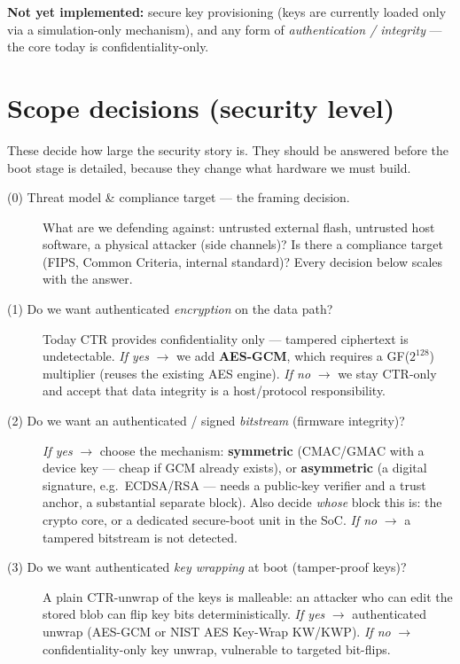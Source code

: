 \documentclass[11pt,a4paper]{article}
\begin{document}
\noindent\textbf{Not yet implemented:} secure key provisioning (keys are currently loaded only via a
simulation-only mechanism), and any form of \emph{authentication / integrity} --- the core today is
confidentiality-only.

\section{Scope decisions (security level)}

\noindent These decide how large the security story is. They should be answered before the boot
stage is detailed, because they change what hardware we must build.

\begin{description}

  \item[(0) Threat model \& compliance target --- the framing decision.]
    What are we defending against: untrusted external flash, untrusted host software, a physical
    attacker (side channels)? Is there a compliance target (FIPS, Common Criteria, internal
    standard)? Every decision below scales with the answer.

  \item[(1) Do we want authenticated \emph{encryption} on the data path?]
    Today CTR provides confidentiality only --- tampered ciphertext is undetectable.
    \emph{If yes} $\rightarrow$ we add \textbf{AES-GCM}, which requires a GF($2^{128}$) multiplier
    (reuses the existing AES engine).
    \emph{If no} $\rightarrow$ we stay CTR-only and accept that data integrity is a host/protocol
    responsibility.

  \item[(2) Do we want an authenticated / signed \emph{bitstream} (firmware integrity)?]
    \emph{If yes} $\rightarrow$ choose the mechanism:
    \textbf{symmetric} (CMAC/GMAC with a device key --- cheap if GCM already exists), or
    \textbf{asymmetric} (a digital signature, e.g.\ ECDSA/RSA --- needs a public-key verifier and a
    trust anchor, a substantial separate block). Also decide \emph{whose} block this is: the crypto
    core, or a dedicated secure-boot unit in the SoC.
    \emph{If no} $\rightarrow$ a tampered bitstream is not detected.

  \item[(3) Do we want authenticated \emph{key wrapping} at boot (tamper-proof keys)?]
    A plain CTR-unwrap of the keys is malleable: an attacker who can edit the stored blob can flip
    key bits deterministically.
    \emph{If yes} $\rightarrow$ authenticated unwrap (AES-GCM or NIST AES Key-Wrap KW/KWP).
    \emph{If no} $\rightarrow$ confidentiality-only key unwrap, vulnerable to targeted bit-flips.


\end{description}
\end{document}
